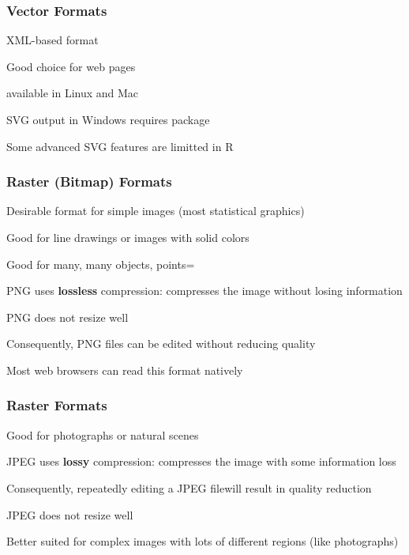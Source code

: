\documentclass[12pt]{beamer}\usepackage[]{graphicx}\usepackage[]{color}
\begin{document}

\begin{frame}
\frametitle{Vector Formats}

\bi
  \item XML-based format
  \item Good choice for web pages
  \item {} available in Linux and Mac
  \item SVG output in Windows requires package 
  \item Some advanced SVG features are limitted in R
\ei
\eb

\end{frame}


\begin{frame}
\frametitle{Raster (Bitmap) Formats}

\bi
  \item Desirable format for simple images (most statistical graphics)
  \item Good for line drawings or images with solid colors
  \item Good for many, many objects, points=
  \item PNG uses \textbf{lossless} compression: compresses the image without losing information
  \item PNG does not resize well
  \item Consequently, PNG files can be edited without reducing quality
  \item Most web browsers can read this format natively
\ei
\eb

\end{frame}


\begin{frame}
\frametitle{Raster Formats}

\bi
  \item Good for photographs or natural scenes
  \item JPEG uses \textbf{lossy} compression: compresses the image with some information loss
  \item Consequently, repeatedly editing a JPEG filewill result in quality reduction
  \item JPEG does not resize well
  \item Better suited for complex images with lots of different regions (like photographs)
\ei
\eb

\end{frame}
\end{document}
